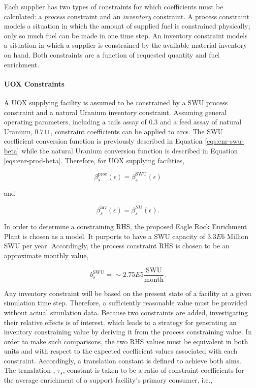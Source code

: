 Each supplier has two types of constraints for which coefficients must be
calculated: a \textit{process} constraint and an \textit{inventory} constraint. A
process constraint models a situation in which the amount of supplied fuel is
constrained physically; only so much fuel can be made in one time step. An
inventory constraint models a situation in which a supplier is constrained by
the available material inventory on hand. Both constraints are a function of
requested quantity and fuel enrichment.

\paragraph{UOX Constraints}

A UOX supplying facility is assumed to be constrained by a SWU process
constraint and a natural Uranium inventory constraint. Assuming general
operating parameters, including a tails assay of $0.3$ and a feed assay of
natural Uranium, $0.711$, constraint coefficients can be applied to arcs. The SWU
coefficient conversion function is previously described in Equation
\ref{eqs:enr-swu-beta} while the natural Uranium conversion function is
described in Equation \ref{eqs:enr-prod-beta}. Therefore, for UOX supplying
facilities,

\begin{equation}
\beta^{\text{proc}}_s(\epsilon) = \beta^{\text{SWU}}_s(\epsilon) 
\end{equation}

and

\begin{equation}
\beta^{\text{inv}}_s(\epsilon) = \beta^{\text{NU}}_s(\epsilon). 
\end{equation}

In order to determine a constraining RHS, the proposed Eagle Rock Enrichment
Plant is chosen as a model. It purports to have a SWU capacity of $3.3E6$
Million SWU per year. Accordingly, the process constraint RHS is chosen to be an
approximate monthly value,

\begin{equation}
b^{\text{SWU}}_s = \sim 2.75E5 \frac{\text{SWU}}{\text{month}}.
\end{equation}

Any inventory constraint will be based on the present state of a facility at a
given simulation time step. Therefore, a sufficiently reasonable value must be
provided without actual simulation data. Because two constraints are added,
investigating their relative effects is of interest, which leads to a strategy
for generating an inventory constraining value by deriving it from the process
constraining value. In order to make such comparisons, the two RHS values must
be equivalent in both units and with respect to the expected coefficient values
associated with each constraint. Accordingly, a translation constant is defined
to achieve both aims. The translation , $\tau_s$, constant is taken to be a
ratio of constraint coefficients for the average enrichment of a support
facility's primary consumer, i.e.,

